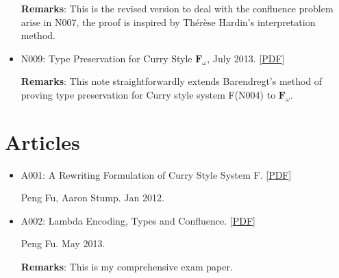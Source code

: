 \documentclass[10pt]{article}
\begin{document}
\begin{itemize}
\noindent \textbf{Remarks}: This is the revised version to deal with the confluence problem arise in N007, the proof is inspired by Thérèse Hardin's interpretation method. 

\item N009: Type Preservation for Curry Style $\mathbf{F}_{\omega}$, July 2013. [\href{../../document/notes/fomega-presv.pdf}{PDF}]

\noindent \textbf{Remarks}: This note straightforwardly extends Barendregt's method of proving type preservation for Curry style system F(N004) to $\mathbf{F}_{\omega}$. 


  
\end{itemize}

\section*{Articles}

\begin{itemize}
\item A001: A Rewriting Formulation of Curry Style System F. [\href{../../document/notes/rewrite-f.pdf}{PDF}]

\noindent Peng Fu, Aaron Stump. Jan 2012.

\item A002: Lambda Encoding, Types and Confluence. [\href{../../document/notes/comp-exam.pdf}{PDF}]

\noindent Peng Fu. May 2013.

\noindent \textbf{Remarks}: This is my comprehensive exam paper. 


\end{itemize}
\end{document}

